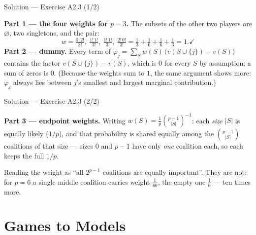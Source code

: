 \documentclass[aspectratio=169,11pt]{beamer}
\begin{document}
\begin{frame}{Solution --- Exercise A2.3 (1/2)}
\begin{solutionbox}
  \textbf{Part 1 --- the four weights for $p=3$.} The subsets of the other two
  players are $\varnothing$, two singletons, and the pair:
  \[
    w = \tfrac{0!\,2!}{3!},\ \tfrac{1!\,1!}{3!},\ \tfrac{1!\,1!}{3!},\ \tfrac{2!\,0!}{3!}
      = \tfrac13 + \tfrac16 + \tfrac16 + \tfrac13 = 1. \checkmark
  \]
  \textbf{Part 2 --- dummy.} Every term of
  $\varphi_j=\sum_S w(S)\,\bigl(v(S\cup\{j\})-v(S)\bigr)$ contains the factor
  $v(S\cup\{j\})-v(S)$, which is $0$ for every $S$ by assumption; a sum of zeros
  is $0$. (Because the weights sum to $1$, the same argument shows more: $\varphi_j$
  always lies between $j$'s smallest and largest marginal contribution.)
\end{solutionbox}
\end{frame}

\begin{frame}{Solution --- Exercise A2.3 (2/2)}
\begin{solutionbox}
  \medskip
  \textbf{Part 3 --- endpoint weights.} Writing $w(S)=\frac1p\binom{p-1}{|S|}^{-1}$:
  each \emph{size} $|S|$ is equally likely ($1/p$), and that probability is shared
  equally among the $\binom{p-1}{|S|}$ coalitions of that size --- sizes $0$ and
  $p-1$ have only \emph{one} coalition each, so each keeps the full $1/p$.
\end{solutionbox}
\begin{mistake}
  Reading the weight as ``all $2^{p-1}$ coalitions are equally important''. They are
  not: for $p=6$ a single middle coalition carries weight $\tfrac1{60}$, the empty one
  $\tfrac16$ --- ten times more.
\end{mistake}
\end{frame}

\section{Games to Models}
\end{document}

